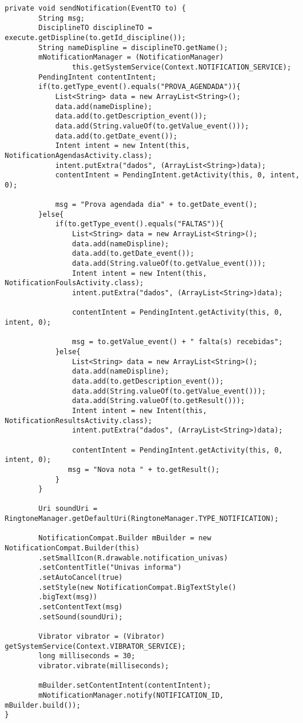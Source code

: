 \begin{lstlisting}[style=custom_JAVA]
private void sendNotification(EventTO to) {
        String msg;
        DisciplineTO disciplineTO = execute.getDispline(to.getId_discipline());
        String nameDispline = disciplineTO.getName();
        mNotificationManager = (NotificationManager)
                this.getSystemService(Context.NOTIFICATION_SERVICE);
        PendingIntent contentIntent;
        if(to.getType_event().equals("PROVA_AGENDADA")){
            List<String> data = new ArrayList<String>();
            data.add(nameDispline);
            data.add(to.getDescription_event());
            data.add(String.valueOf(to.getValue_event()));
            data.add(to.getDate_event());
            Intent intent = new Intent(this, NotificationAgendasActivity.class);
            intent.putExtra("dados", (ArrayList<String>)data);
            contentIntent = PendingIntent.getActivity(this, 0, intent, 0);

            msg = "Prova agendada dia" + to.getDate_event();
        }else{
            if(to.getType_event().equals("FALTAS")){
                List<String> data = new ArrayList<String>();
                data.add(nameDispline);
                data.add(to.getDate_event());
                data.add(String.valueOf(to.getValue_event()));
                Intent intent = new Intent(this, NotificationFoulsActivity.class);
                intent.putExtra("dados", (ArrayList<String>)data);

                contentIntent = PendingIntent.getActivity(this, 0, intent, 0);

                msg = to.getValue_event() + " falta(s) recebidas";
            }else{
                List<String> data = new ArrayList<String>();
                data.add(nameDispline);
                data.add(to.getDescription_event());
                data.add(String.valueOf(to.getValue_event()));
                data.add(String.valueOf(to.getResult()));
                Intent intent = new Intent(this, NotificationResultsActivity.class);
                intent.putExtra("dados", (ArrayList<String>)data);

                contentIntent = PendingIntent.getActivity(this, 0, intent, 0);
               msg = "Nova nota " + to.getResult();
            }
        }

        Uri soundUri = RingtoneManager.getDefaultUri(RingtoneManager.TYPE_NOTIFICATION);

        NotificationCompat.Builder mBuilder = new NotificationCompat.Builder(this)
        .setSmallIcon(R.drawable.notification_univas)
        .setContentTitle("Univas informa")
        .setAutoCancel(true)
        .setStyle(new NotificationCompat.BigTextStyle()
        .bigText(msg))
        .setContentText(msg)
        .setSound(soundUri);
        
        Vibrator vibrator = (Vibrator) getSystemService(Context.VIBRATOR_SERVICE);
        long milliseconds = 30;
        vibrator.vibrate(milliseconds);

        mBuilder.setContentIntent(contentIntent);
        mNotificationManager.notify(NOTIFICATION_ID, mBuilder.build());
}
\end{lstlisting}